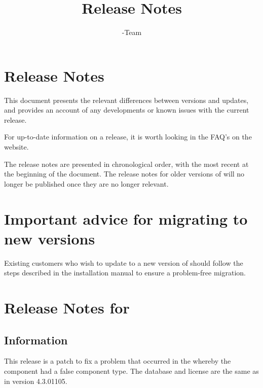 \documentclass[en,a4paper,twoside,manual,guidancer]{bxreport}
\begin{document}
\title{\GDr{} Release Notes}
\author*{\GD-Team}{}
\maketitle

\setcounter{secnumdepth}{0}

\clearpage
\section{\gd Release Notes}
This document presents the relevant differences between versions and updates, and provides an account of any developments or known issues with the current release. 

For up-to-date information on a release, it is worth looking in the FAQ's on the \gd{} website. 

The release notes are presented in chronological order, with the most recent at the beginning of the document. The release notes for older versions of \gd{}  will no longer be published once they are no longer relevant. 

\section{Important advice for migrating to new \gd{} versions}
Existing customers who wish to update to a new version of \gd{} should follow the steps described in the installation manual to ensure a problem-free migration.


\makeatletter
\section{Release Notes for \gd{} \@bxversion}
\makeatother
\subsection{Information}
This release is a patch to fix a problem that occurred in the  whereby the  component had a false component type. The database and license are the same as in version 4.3.01105. 

\makeatletter
\end{document}
